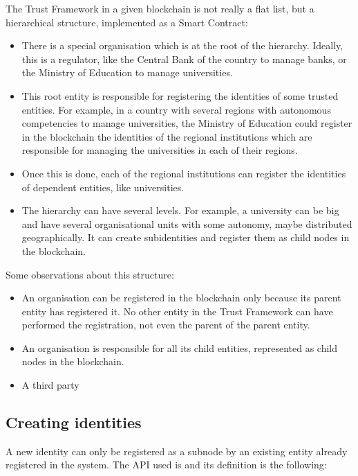 \documentclass[a4paper,12pt,english]{sphinxhowto}
\begin{document}
\sphinxAtStartPar
The Trust Framework in a given blockchain is not really a flat list, but a hierarchical structure, implemented as a Smart Contract:
\begin{itemize}
\item {} 
\sphinxAtStartPar
There is a special organisation which is at the root of the hierarchy. Ideally, this is a regulator, like the Central Bank of the country to manage banks, or the Ministry of Education to manage universities.

\item {} 
\sphinxAtStartPar
This root entity is responsible for registering the identities of some trusted entities. For example, in a country with several regions with autonomous competencies to manage universities, the Ministry of Education could register in the blockchain the identities of the regional institutions which are responsible for managing the universities in each of their regions.

\item {} 
\sphinxAtStartPar
Once this is done, each of the regional institutions can register the identities of dependent entities, like universities.

\item {} 
\sphinxAtStartPar
The hierarchy can have several levels. For example, a university can be big and have several organisational units with some autonomy, maybe distributed geographically. It can create sub\sphinxhyphen{}identities and register them as child nodes in the blockchain.

\end{itemize}

\sphinxAtStartPar
Some observations about this structure:
\begin{itemize}
\item {} 
\sphinxAtStartPar
An organisation can be registered in the blockchain only because its parent entity has registered it. No other entity in the Trust Framework can have performed the registration, not even the parent of the parent entity.

\item {} 
\sphinxAtStartPar
An organisation is responsible for all its child entities, represented as child nodes in the blockchain.

\item {} 
\sphinxAtStartPar
A third party

\end{itemize}


\subsection{Creating identities}
\label{\detokenize{ssi/trustframework:creating-identities}}
\sphinxAtStartPar
A new identity can only be registered as a sub\sphinxhyphen{}node by an existing entity already registered in the system. The API used is  and its definition is the following:
\end{document}

